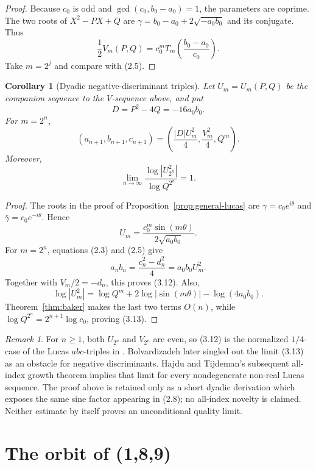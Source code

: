 \documentclass[11pt]{article}
\newtheorem{corollary}[theorem]{Corollary}
\theoremstyle{remark}
\newtheorem{remark}[theorem]{Remark}
\begin{document}
\begin{proof}
Because \(c_0\) is odd and \(\gcd(c_0,b_0-a_0)=1\), the parameters are
coprime.
The two roots of \(X^2-PX+Q\) are
\(\gamma=b_0-a_0+2\sqrt{-a_0b_0}\) and its conjugate.  Thus
\[
 \frac12V_m(P,Q)=c_0^mT_m\left(\frac{b_0-a_0}{c_0}\right).
\]
Take \(m=2^j\) and compare with (2.5).
\end{proof}

\begin{corollary}[Dyadic negative-discriminant triples]
\label{cor:negative-discriminant}
Let \(U_m=U_m(P,Q)\) be the companion sequence to the \(V\)-sequence
above, and put
\[
 D=P^2-4Q=-16a_0b_0.
\]
For \(m=2^n\),
\[
 (a_{n+1},b_{n+1},c_{n+1})
 =\left(\frac{|D|U_m^2}{4},\frac{V_m^2}{4},Q^m\right).
                                                               \tag{3.12}
\]
Moreover,
\[
 \lim_{n\to\infty}
 \frac{\log|U_{2^n}^2|}{\log Q^{2^n}}=1.                 \tag{3.13}
\]
\end{corollary}

\begin{proof}
The roots in the proof of Proposition~\ref{prop:general-lucas} are
\(\gamma=c_0e^{i\theta}\) and \(\bar\gamma=c_0e^{-i\theta}\).  Hence
\[
 U_m=\frac{c_0^m\sin(m\theta)}{2\sqrt{a_0b_0}}.
\]
For \(m=2^n\), equations (2.3) and (2.5) give
\[
 a_nb_n=\frac{c_n^2-d_n^2}{4}=a_0b_0U_m^2.
\]
Together with \(V_m/2=-d_n\), this proves (3.12).  Also,
\[
 \log|U_m^2|
 =\log Q^m+2\log|\sin(m\theta)|-\log(4a_0b_0).
\]
Theorem~\ref{thm:baker} makes the last two terms \(O(n)\), while
\(\log Q^{2^n}=2^{n+1}\log c_0\), proving (3.13).
\end{proof}

\begin{remark}
For \(n\geq1\), both \(U_{2^n}\) and \(V_{2^n}\) are even, so (3.12) is
the normalized \(1/4\)-case of the Lucas \(abc\)-triples in
\cite[\S2.2]{Bolvardizadeh2023}.  Bolvardizadeh later singled out the
limit (3.13) as an obstacle for negative discriminants.  Hajdu and
Tijdeman's subsequent all-index growth theorem
\cite[Theorem~2.1]{HajduTijdeman2025} implies that limit for every
nondegenerate non-real Lucas sequence.  The proof above is retained only
as a short dyadic derivation which exposes the same sine factor appearing
in (2.8); no all-index novelty is claimed.  Neither estimate by itself
proves an unconditional quality limit.
\end{remark}

\section{The orbit of (1,8,9)}
\end{document}
